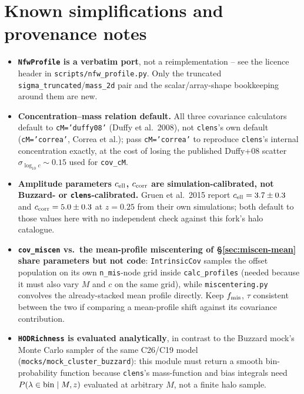 \documentclass[a4paper, 11pt]{article}
\newcommand{\modname}[1]{\textcolor{kwcol}{\texttt{#1}}}
\newcommand{\pyfile}[1]{{\small\texttt{#1}}}
\begin{document}
\section{Known simplifications and provenance notes}
\label{sec:notes}

\begin{itemize}
  \setlength\itemsep{2pt}
  \item \textbf{\texttt{NfwProfile} is a verbatim port}, not a
    reimplementation -- see the licence header in
    \pyfile{scripts/nfw\_profile.py}. Only the truncated
    \texttt{sigma\_truncated}/\texttt{mass\_2d} pair and the
    scalar/array-shape bookkeeping around them are new.
  \item \textbf{Concentration--mass relation default.} All three
    covariance calculators default to \texttt{cM='duffy08'}
    (Duffy et al.\ 2008), not \modname{clens}'s own default
    (\texttt{cM='correa'}, Correa et al.); pass \texttt{cM='correa'}
    to reproduce \modname{clens}'s internal concentration exactly,
    at the cost of losing the published Duffy+08 scatter
    $\sigma_{\log_{10}c}\sim0.15$ used for \texttt{cov\_cM}.
  \item \textbf{Amplitude parameters $c_{\rm ell}$, $c_{\rm corr}$ are
    simulation-calibrated, not Buzzard- or \modname{clens}-calibrated.}
    Gruen et al.\ 2015 report $c_{\rm ell}=3.7\pm0.3$ and
    $c_{\rm corr}=5.0\pm0.3$ at $z=0.25$ from their own simulations;
    both default to those values here with no independent check
    against this fork's halo catalogue.
  \item \textbf{\texttt{cov\_miscen} vs.\ the mean-profile
    miscentering of \S\ref{sec:miscen-mean} share parameters but not
    code}: \texttt{IntrinsicCov} samples the offset population on its
    own \texttt{n\_mis}-node grid inside \texttt{calc\_profiles}
    (needed because it must also vary $M$ and $c$ on the same grid),
    while \texttt{miscentering.py} convolves the already-stacked mean
    profile directly. Keep $f_{\rm mis}$, $\tau$ consistent between
    the two if comparing a mean-profile shift against its covariance
    contribution.
  \item \textbf{\texttt{HODRichness} is evaluated analytically}, in
    contrast to the Buzzard mock's Monte Carlo sampler of the same
    C26/C19 model (\pyfile{mocks/mock\_cluster\_buzzard}): this module
    must return a smooth bin-probability function because
    \modname{clens}'s mass-function and bias integrals need
    $P(\lambda\in{\rm bin}\mid M,z)$ evaluated at arbitrary $M$, not a
    finite halo sample.
\end{itemize}
\end{document}
